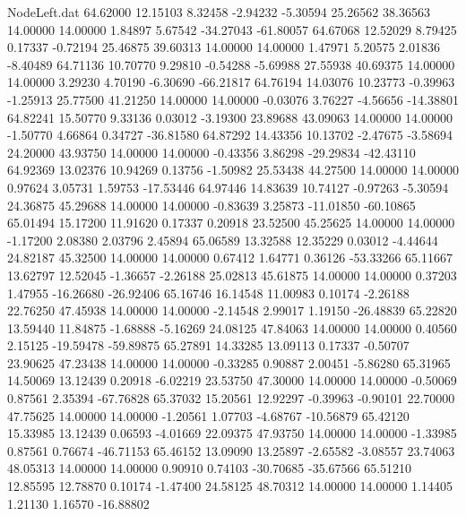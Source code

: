 \begin{filecontents}{NodeLeft.dat}
  64.62000   12.15103    8.32458    -2.94232   -5.30594   25.26562   38.36563   14.00000   14.00000    1.84897    5.67542  -34.27043  -61.80057
  64.67068   12.52029    8.79425     0.17337   -0.72194   25.46875   39.60313   14.00000   14.00000    1.47971    5.20575    2.01836   -8.40489
  64.71136   10.70770    9.29810    -0.54288   -5.69988   27.55938   40.69375   14.00000   14.00000    3.29230    4.70190   -6.30690  -66.21817
  64.76194   14.03076   10.23773    -0.39963   -1.25913   25.77500   41.21250   14.00000   14.00000   -0.03076    3.76227   -4.56656  -14.38801
  64.82241   15.50770    9.33136     0.03012   -3.19300   23.89688   43.09063   14.00000   14.00000   -1.50770    4.66864    0.34727  -36.81580
  64.87292   14.43356   10.13702    -2.47675   -3.58694   24.20000   43.93750   14.00000   14.00000   -0.43356    3.86298  -29.29834  -42.43110
  64.92369   13.02376   10.94269     0.13756   -1.50982   25.53438   44.27500   14.00000   14.00000    0.97624    3.05731    1.59753  -17.53446
  64.97446   14.83639   10.74127    -0.97263   -5.30594   24.36875   45.29688   14.00000   14.00000   -0.83639    3.25873  -11.01850  -60.10865
  65.01494   15.17200   11.91620     0.17337    0.20918   23.52500   45.25625   14.00000   14.00000   -1.17200    2.08380    2.03796    2.45894
  65.06589   13.32588   12.35229     0.03012   -4.44644   24.82187   45.32500   14.00000   14.00000    0.67412    1.64771    0.36126  -53.33266
  65.11667   13.62797   12.52045    -1.36657   -2.26188   25.02813   45.61875   14.00000   14.00000    0.37203    1.47955  -16.26680  -26.92406
  65.16746   16.14548   11.00983     0.10174   -2.26188   22.76250   47.45938   14.00000   14.00000   -2.14548    2.99017    1.19150  -26.48839
  65.22820   13.59440   11.84875    -1.68888   -5.16269   24.08125   47.84063   14.00000   14.00000    0.40560    2.15125  -19.59478  -59.89875
  65.27891   14.33285   13.09113     0.17337   -0.50707   23.90625   47.23438   14.00000   14.00000   -0.33285    0.90887    2.00451   -5.86280
  65.31965   14.50069   13.12439     0.20918   -6.02219   23.53750   47.30000   14.00000   14.00000   -0.50069    0.87561    2.35394  -67.76828
  65.37032   15.20561   12.92297    -0.39963   -0.90101   22.70000   47.75625   14.00000   14.00000   -1.20561    1.07703   -4.68767  -10.56879
  65.42120   15.33985   13.12439     0.06593   -4.01669   22.09375   47.93750   14.00000   14.00000   -1.33985    0.87561    0.76674  -46.71153
  65.46152   13.09090   13.25897    -2.65582   -3.08557   23.74063   48.05313   14.00000   14.00000    0.90910    0.74103  -30.70685  -35.67566
  65.51210   12.85595   12.78870     0.10174   -1.47400   24.58125   48.70312   14.00000   14.00000    1.14405    1.21130    1.16570  -16.88802

\end{filecontents}
